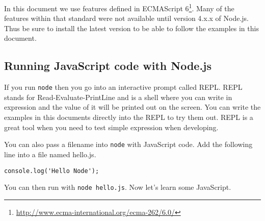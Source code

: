 In this document we use features defined in ECMAScript 6\footnote{\url{http://www.ecma-international.org/ecma-262/6.0/}}. Many of the features within that standard were not available until version 4.x.x of Node.js. Thus be sure to install the latest version to be able to follow the examples in this document.


\subsection{Running JavaScript code with Node.js}
If you run \texttt{node} then you go into an interactive prompt called REPL. REPL stands for Read-Evaluate-PrintLine and is a shell where you can write in expression and the value of it will be printed out on the screen. You can write the examples in this documents directly into the REPL to try them out. REPL is a great tool when you need to test simple expression when developing.

You can also pass a filename into \texttt{node} with JavaScript code. Add the following line into a file named hello.js.
\begin{lstlisting}
console.log('Hello Node');
\end{lstlisting}

You can then run with \texttt{node hello.js}. Now let's learn some JavaScript.

